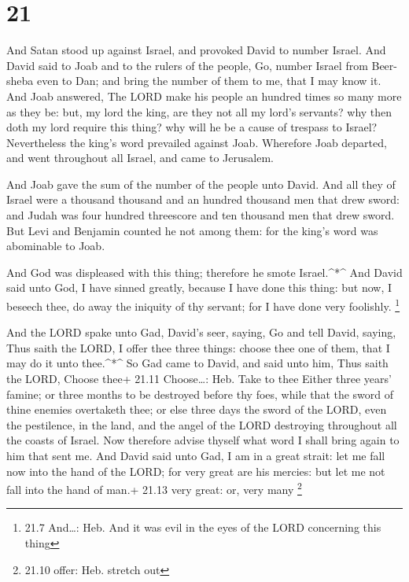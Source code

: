 \hypertarget{section-20}{%
\section{21}\label{section-20}}

 And Satan stood up against Israel, and provoked David to
number Israel.  And David said to Joab and to the rulers of
the people, Go, number Israel from Beer-sheba even to Dan; and bring the
number of them to me, that I may know it.  And Joab
answered, The LORD make his people an hundred times so many more as they
be: but, my lord the king, are they not all my lord's servants? why then
doth my lord require this thing? why will he be a cause of trespass to
Israel?  Nevertheless the king's word prevailed against
Joab. Wherefore Joab departed, and went throughout all Israel, and came
to Jerusalem.

 And Joab gave the sum of the number of the people unto
David. And all they of Israel were a thousand thousand and an hundred
thousand men that drew sword: and Judah was four hundred threescore and
ten thousand men that drew sword.  But Levi and Benjamin
counted he not among them: for the king's word was abominable to Joab.

 And God was displeased with this thing; therefore he smote
Israel.\^{}*\^{}  And David said unto God, I have sinned
greatly, because I have done this thing: but now, I beseech thee, do
away the iniquity of thy servant; for I have done very foolishly.
\footnote{21.7 And\ldots: Heb. And it was evil in the eyes of the LORD
  concerning this thing}

 And the LORD spake unto Gad, David's seer, saying,
 Go and tell David, saying, Thus saith the LORD, I offer
thee three things: choose thee one of them, that I may do it unto
thee.\^{}*\^{}  So Gad came to David, and said unto him,
Thus saith the LORD, Choose thee+ 21.11 Choose\ldots: Heb. Take to thee
 Either three years' famine; or three months to be
destroyed before thy foes, while that the sword of thine enemies
overtaketh thee; or else three days the sword of the LORD, even the
pestilence, in the land, and the angel of the LORD destroying throughout
all the coasts of Israel. Now therefore advise thyself what word I shall
bring again to him that sent me.  And David said unto Gad,
I am in a great strait: let me fall now into the hand of the LORD; for
very great are his mercies: but let me not fall into the hand of man.+
21.13 very great: or, very many \footnote{21.10 offer: Heb. stretch out}

